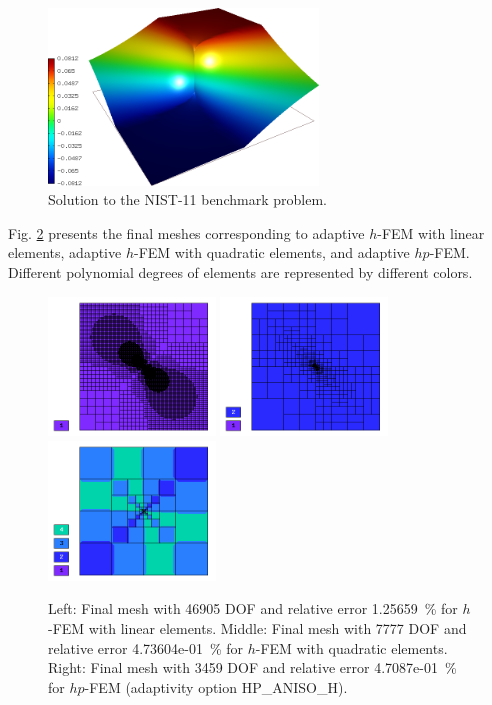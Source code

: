 \documentclass[12pt]{elsarticle}
\begin{document}
\begin{figure}[H]
\centering
\includegraphics[height=4.7cm]{nist/nist-11/solution.png}
\caption{Solution to the NIST-11 benchmark problem.}
\vspace{-3mm}
\label{fig:sln-nist11}
\end{figure}

Fig. \ref{fig:nist-11-hp-aniso} presents the final meshes corresponding to adaptive $h$-FEM with 
linear elements, adaptive $h$-FEM with quadratic elements, and adaptive $hp$-FEM. Different 
polynomial degrees of elements are represented by different colors. 

\begin{figure}[H]
\centering
\includegraphics[height=3.7cm]{nist/nist-11/mesh_h1_aniso.png}
\includegraphics[height=3.7cm]{nist/nist-11/mesh_h2_aniso.png}
\includegraphics[height=3.7cm]{nist/nist-11/mesh_hp_aniso.png}
\vspace{-3mm}
\caption{
Left: Final mesh with 46905 DOF and relative error 1.25659~\% for $h$-FEM with linear elements.
Middle: Final mesh with 7777 DOF and relative error 4.73604e-01~\% for $h$-FEM with quadratic elements. 
Right: Final mesh with 3459 DOF and relative error 4.7087e-01~\% for $hp$-FEM (adaptivity option HP\_ANISO\_H).}
\vspace{-2mm}
\label{fig:nist-11-hp-aniso}
\end{figure}
\end{document}
